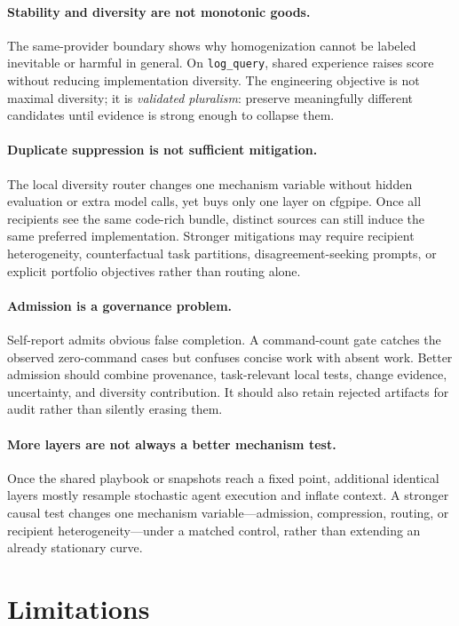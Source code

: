 \documentclass[letterpaper]{article}
\begin{document}
\paragraph{Stability and diversity are not monotonic goods.}
The same-provider boundary shows why homogenization cannot be labeled inevitable
or harmful in general. On \texttt{log\_query}, shared experience raises score
without reducing implementation diversity. The engineering objective is not
maximal diversity; it is \emph{validated pluralism}: preserve meaningfully
different candidates until evidence is strong enough to collapse them.

\paragraph{Duplicate suppression is not sufficient mitigation.}
The local diversity router changes one mechanism variable without hidden
evaluation or extra model calls, yet buys only one layer on cfgpipe. Once all
recipients see the same code-rich bundle, distinct sources can still induce the
same preferred implementation. Stronger mitigations may require recipient
heterogeneity, counterfactual task partitions, disagreement-seeking prompts, or
explicit portfolio objectives rather than routing alone.

\paragraph{Admission is a governance problem.}
Self-report admits obvious false completion. A command-count gate catches the
observed zero-command cases but confuses concise work with absent work. Better
admission should combine provenance, task-relevant local tests, change evidence,
uncertainty, and diversity contribution. It should also retain rejected artifacts
for audit rather than silently erasing them.

\paragraph{More layers are not always a better mechanism test.}
Once the shared playbook or snapshots reach a fixed point, additional identical
layers mostly resample stochastic agent execution and inflate context. A stronger
causal test changes one mechanism variable---admission, compression, routing, or
recipient heterogeneity---under a matched control, rather than extending an
already stationary curve.

\section{Limitations}
\end{document}
